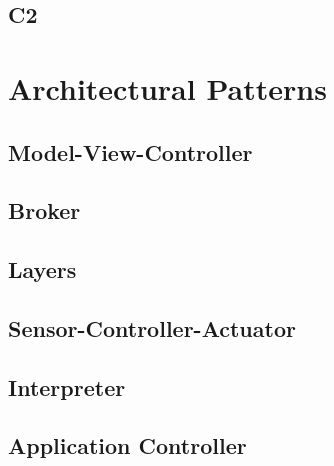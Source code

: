 
\subsection{C2}


\section{Architectural Patterns}


\subsection{Model-View-Controller}


\subsection{Broker}


\subsection{Layers}


\subsection{Sensor-Controller-Actuator}


\subsection{Interpreter}


\subsection{Application Controller}


